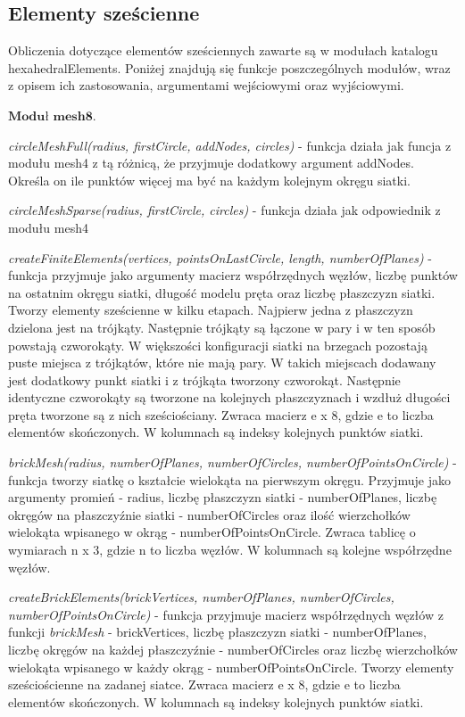 \subsection{Elementy sześcienne}
\label{cha:elementy szescienne}

Obliczenia dotyczące elementów sześciennych zawarte są w modułach katalogu hexahedralElements. Poniżej znajdują się funkcje poszczególnych modułów, wraz z opisem ich zastosowania, argumentami wejściowymi oraz wyjściowymi.

 \( \textbf{Moduł mesh8} \).

\vspace {3mm}
\textit{circleMeshFull(radius, firstCircle, addNodes, circles)} - funkcja działa jak funcja z modułu mesh4 z tą różnicą, że przyjmuje dodatkowy argument addNodes. Określa on ile punktów więcej ma być na każdym kolejnym okręgu siatki.

\vspace {3mm}
\textit{circleMeshSparse(radius, firstCircle, circles)} - funkcja działa jak odpowiednik z modułu mesh4

\vspace {3mm}
\textit{createFiniteElements(vertices, pointsOnLastCircle, length, numberOfPlanes)} - funkcja przyjmuje jako argumenty macierz współrzędnych węzłów, liczbę punktów na ostatnim okręgu siatki, długość modelu pręta oraz liczbę płaszczyzn siatki. Tworzy elementy sześcienne w kilku etapach. Najpierw jedna z płaszczyzn dzielona jest na trójkąty. Następnie trójkąty są łączone w pary i w ten sposób powstają czworokąty. W większości konfiguracji siatki na brzegach pozostają puste miejsca z trójkątów, które nie mają pary. W takich miejscach dodawany jest dodatkowy punkt siatki i z trójkąta tworzony czworokąt. Następnie identyczne czworokąty są tworzone na kolejnych płaszczyznach i wzdłuż długości pręta tworzone są z nich sześciościany. Zwraca macierz e x 8, gdzie e to liczba elementów skończonych. W kolumnach są indeksy kolejnych punktów siatki.

\vspace {3mm}
\textit{brickMesh(radius, numberOfPlanes, numberOfCircles, numberOfPointsOnCircle)} - funkcja tworzy siatkę o kształcie wielokąta na pierwszym okręgu. Przyjmuje jako argumenty promień - radius, liczbę płaszczyzn siatki - numberOfPlanes, liczbę okręgów na płaszczyźnie siatki - numberOfCircles oraz ilość wierzchołków wielokąta wpisanego w okrąg - numberOfPointsOnCircle. Zwraca tablicę o wymiarach n x 3, gdzie n to liczba węzłów. W kolumnach są kolejne współrzędne węzłów.

\vspace {3mm}
\textit{createBrickElements(brickVertices, numberOfPlanes, numberOfCircles, numberOfPointsOnCircle)} - funkcja przyjmuje macierz współrzędnych węzłów z funkcji \textit{brickMesh} - brickVertices, liczbę płaszczyzn siatki - numberOfPlanes, liczbę okręgów na każdej płaszczyźnie - numberOfCircles oraz liczbę wierzchołków wielokąta wpisanego w każdy okrąg - numberOfPointsOnCircle. Tworzy elementy sześciościenne na zadanej siatce. Zwraca macierz e x 8, gdzie e to liczba elementów skończonych. W kolumnach są indeksy kolejnych punktów siatki.


